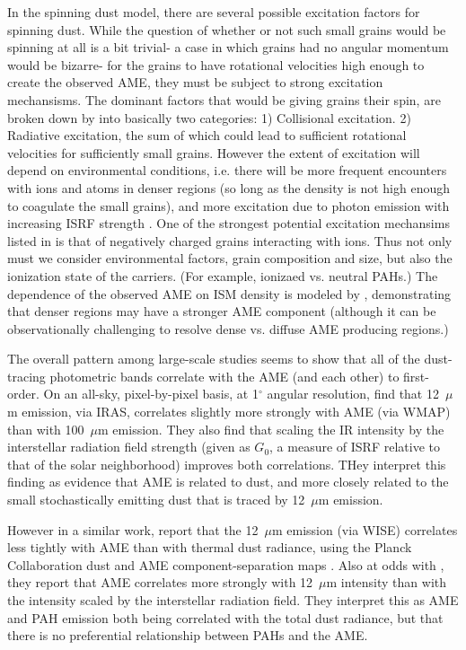 \documentclass[preprint2,longabstract]{aastex}
\begin{document}
     In the spinning dust model, there are several possible excitation factors for spinning dust. While the question of whether or not such small grains would be spinning at all is a bit trivial- a case in which grains had no angular momentum would be bizarre- for the grains to have rotational velocities high enough to create the observed AME, they must be subject to strong excitation mechansisms. The dominant factors that would be giving grains their spin, are broken down by \cite{draine11} into basically two categories: 1) Collisional excitation. 2) Radiative excitation, the sum of which could lead to sufficient rotational velocities for sufficiently small grains. However the extent of excitation will depend on environmental conditions, i.e. there will be more frequent encounters with ions and atoms in denser regions (so long as the density is not high enough to coagulate the small grains), and more excitation due to photon emission with increasing ISRF strength \citep{ali-haimoud09, ali-haimoud13}. One of the strongest potential excitation mechansims listed in \cite{draine11} is that of negatively charged grains interacting with ions. Thus not only must we consider environmental factors, grain composition and size, but also the ionization state of the carriers. (For example, ionizaed vs. neutral PAHs.) The dependence of the observed AME on ISM density is modeled by \cite{ali-haimoud10}, demonstrating that denser regions may have a stronger AME component (although it can be observationally challenging to resolve dense vs. diffuse AME producing regions.)

    The overall pattern among large-scale studies seems to show that all of the dust-tracing photometric bands correlate with the AME (and each other) to first-order.  On an all-sky, pixel-by-pixel basis, at 1$^{\circ}$ angular resolution, \cite{ysard10b} find that 12~$\mu$m emission, via IRAS, correlates slightly more strongly with AME (via WMAP) than with 100~$\mu$m emission.  They also find that scaling the IR intensity by the interstellar radiation field strength (given as $G_0$, a measure of ISRF relative to that of the solar neighborhood) improves both correlations. THey interpret this finding as evidence that AME is related to dust, and more closely related to the small stochastically emitting dust that is traced by 12~$\mu$m emission.

    However in a similar work, \cite{hensley16} report that the 12~$\mu$m emission (via WISE) correlates less tightly with AME than with thermal dust radiance, using the Planck Collaboration dust and AME component-separation maps \citep{planck15X}. Also at odds with \cite{ysard10b}, they report that AME correlates more strongly with 12~$\mu$m intensity than with the intensity scaled by the interstellar radiation field. They interpret this as AME and PAH emission both being correlated with the total dust radiance, but that there is no preferential relationship between PAHs and the AME.
\end{document}
